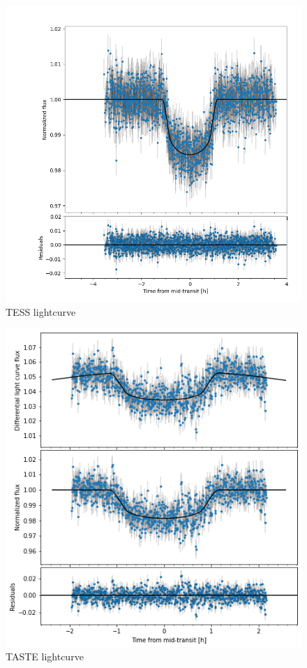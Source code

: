 \documentclass[a4paper,11pt,twocolumn]{article}
\begin{document}
\begin{figure}
    \hspace*{-2cm}
    \centering
    \includegraphics[scale=0.2, angle=0]{../pictures/tess/lctess.png}
    \caption{TESS lightcurve}
   \label{fig: lc1}
\end{figure}




\begin{figure}
    \hspace*{-2cm}
    \centering
    \includegraphics[scale=0.4, angle=0]{../pictures/taste/lctaste.png}
    \caption{TASTE lightcurve}
   \label{fig: lc2}
\end{figure}
\end{document}
